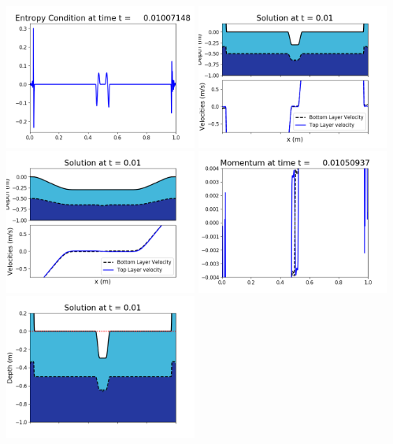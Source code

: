 \documentclass[11pt]{article}
\begin{document}
\vskip 10pt 
\includegraphics[width=0.475\textwidth]{frame0024fig1009.png}
\vskip 10pt 
\includegraphics[width=0.475\textwidth]{frame0025fig1001.png}
\includegraphics[width=0.475\textwidth]{frame0025fig1002.png}
\vskip 10pt 
\includegraphics[width=0.475\textwidth]{frame0025fig1003.png}
\includegraphics[width=0.475\textwidth]{frame0025fig1006.png}
\end{document}
